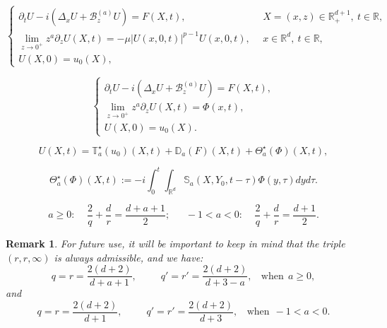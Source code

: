 \documentclass[10pt,a4paper]{amsart}
\newtheorem{remark}{Remark}
\newcommand{\Ba}{\mathscr B_z^{(a)}}
\def \R {\mathbb{R}}
\newcommand{\Rd}{\mathbb R^d}
\newcommand{\p}{\partial}
\begin{document}
\begin{equation}\label{cp02}
\begin{cases}
\p_t U - i(\Delta_x U + \Ba U) = F(X,t), & \ \ X=(x,z)\in \mathbb{R}^{d+1}_+,\ t\in \mathbb R, \\
\displaystyle \lim_{z\to 0^+} z^a \p_z U(X,t) = -\mu |U(x,0,t)|^{p-1}U(x,0,t), & \ \ x\in \Rd,\ t\in \R, \\
U(X,0)=u_0(X), 
\end{cases}
\end{equation}

\begin{equation}\label{nozeroin}
\begin{cases}
\partial_tU-i(\Delta_x U+\Ba U)=F(X,t),\\
\displaystyle \lim_{z\to0^+} z^a\partial_zU(X,t)=\Phi(x,t),\\
U(X,0)=u_0(X).
\end{cases}
\end{equation}

\begin{equation}\label{U0}
U(X,t) = \mathbb T^\star_a(u_0)(X,t) + \mathbb D_a(F)(X,t) + \Theta^\star_a(\Phi)(X,t),
\end{equation}

\begin{equation}\label{Thetastar}
\Theta_a^\star(\Phi)(X,t) := -i \int_0^{t} \int_{\Rd}  \mathbb S_a(X,Y_0,t-\tau) \Phi(y,\tau) dy d\tau.
\end{equation}

\begin{equation}\label{acinfty}
a\ge 0:\ \ \ \ \ \frac 2q +\frac dr = \frac{d+a+1}2;\ \ \ \ \ \ \  -1<a<0:\ \ \ \ \ 
\frac 2q +\frac dr = \frac{d+1}2.
\end{equation}

\begin{remark}\label{R:rr}
For future use, it will be important to keep in mind that the triple $(r,r,\infty)$ is always admissible, and we have: 
\begin{equation}\label{same}
q = r = \frac{2(d+2)}{d+a+1},\ \ \ \ \ \ \ \ \ \ \ q' = r' = \frac{2(d+2)}{d+3-a},\ \ \ \ \text{when}\ \ a\ge 0,
\end{equation}
and
\begin{equation}\label{same0}
q = r = \frac{2(d+2)}{d+1},\ \ \ \ \ \ \ \ \ \ \ q' = r' = \frac{2(d+2)}{d+3},\ \ \ \ \text{when}\ \ -1<a< 0.
\end{equation}
\end{remark}
\end{document}
